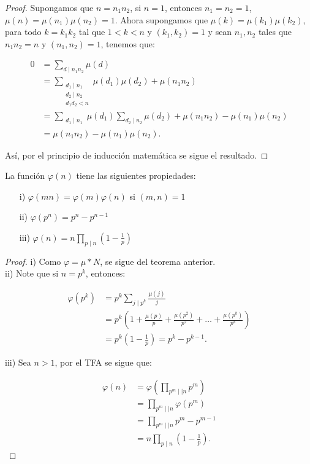 \begin{proof}

Supongamos que $n=n_1n_2$, si $n=1$, entonces $n_1=n_2=1$, $\mu(n)=\mu(n_1)\mu(n_2)=1$. Ahora supongamos que $\mu(k)=\mu(k_1)\mu(k_2)$, para todo $k=k_1k_2$ tal que $1<k<n$ y $(k_1,k_2)=1$ y sean $n_1,n_2$ tales que $n_1n_2=n$ y $(n_1,n_2)=1$, tenemos que:

\begin{align*}
    0&=\sum_{d\mid n_1n_2}\mu(d)\\
    &=\sum_{\substack{d_1\mid n_1\\ d_2\mid n_2\\d_1d_2<n}}\mu(d_1)\mu(d_2)+\mu(n_1n_2)\\
    &=\sum_{\substack{d_1\mid n_1}}\mu(d_1)\sum_{d_2\mid n_2}\mu(d_2)+\mu(n_1n_2)-\mu(n_1)\mu(n_2)\\
    &=\mu(n_1n_2)-\mu(n_1)\mu(n_2)
.\end{align*}

Así, por el principio de inducción matemática se sigue el resultado.
\end{proof}

\begin{corollary}
La función $\varphi(n)$ tiene las siguientes propiedades:

\begin{itemize}
\item[i)] $\varphi(mn)=\varphi(m)\varphi(n)$ si $(m,n)=1$

\item[ii)] $\varphi(p^n)=p^n-p^{n-1}$

\item[iii)] $\varphi(n)=n\displaystyle\prod_{p\mid n}\left(1-\frac{1}{p}\right)  $
\end{itemize}
\end{corollary}

\begin{proof}

i) Como $\varphi=\mu* N$, se sigue del teorema anterior.\\

ii) Note que si $n=p^k$, entonces:

\begin{align*}
    \varphi(p^k)&=p^k\sum_{j\mid p^k}\frac{\mu(j)}{j}\\
    &=p^k\left(1+\frac{\mu(p)}{p}+\frac{\mu(p^2)}{p^2}+\ldots+\frac{\mu(p^k)}{p^k}\right)\\
    &=p^k \left(1-\frac{1}{p}\right)=p^k-p^{k-1}
.\end{align*}

iii) Sea $n>1$, por el TFA se sigue que:

\begin{align*}
    \varphi(n)&= \varphi \left( \prod_{p^m\mid\mid n}p^m \right)\\
    &= \prod_{p^m\mid\mid n}\varphi(p^m)\\
    &=  \prod_{p^m\mid\mid n} p^m-p^{m-1}\\
    &=n \prod_{p\mid n}\left( 1-\frac{1}{p} \right)
.\end{align*}
\end{proof}


